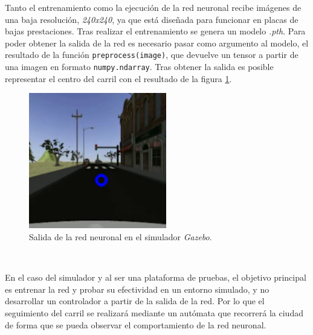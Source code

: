 Tanto el entrenamiento como la ejecución de la red neuronal recibe imágenes de una baja resolución, \textit{240x240}, ya que está diseñada para funcionar en placas de bajas prestaciones. Tras realizar el entrenamiento se genera un modelo \textit{.pth}. Para poder obtener la salida de la red es necesario pasar como argumento al modelo, el resultado de la función \verb|preprocess(image)|, que devuelve un tensor a partir de una imagen en formato \verb|numpy.ndarray|. Tras obtener la salida es posible representar el centro del carril con el resultado de la figura \ref{fig:outputnnsim}.\\

\begin{figure} [h!]
	\begin{center}
		\includegraphics[width=6cm]{figs/outputNNsim}
	\end{center}
	\caption{Salida de la red neuronal en el simulador \textit{Gazebo}.}
	\label{fig:outputnnsim}
\end{figure}\

En el caso del simulador y al ser una plataforma de pruebas, el objetivo principal es entrenar la red y probar su efectividad en un entorno simulado, y no desarrollar un controlador a partir de la salida de la red. Por lo que el seguimiento del carril se realizará mediante un autómata que recorrerá la ciudad de forma que se pueda observar el comportamiento de la red neuronal.\\

